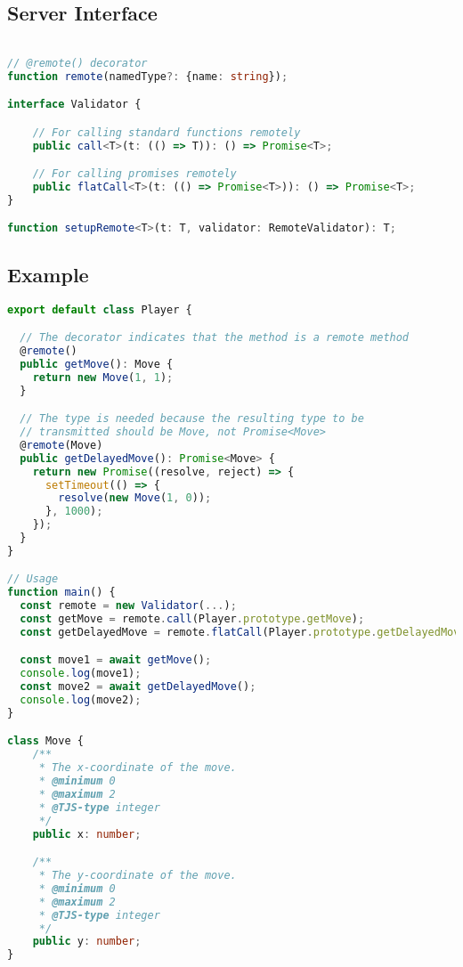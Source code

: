 \documentclass{article}
\begin{document}
\subsection*{Server Interface}

\begin{lstlisting}[language=Typescript]

// @remote() decorator
function remote(namedType?: {name: string});

interface Validator {

    // For calling standard functions remotely
    public call<T>(t: (() => T)): () => Promise<T>;

    // For calling promises remotely
    public flatCall<T>(t: (() => Promise<T>)): () => Promise<T>;
}

function setupRemote<T>(t: T, validator: RemoteValidator): T;

\end{lstlisting}

\subsection*{Example}

\begin{lstlisting}[language=Typescript]
export default class Player {

  // The decorator indicates that the method is a remote method
  @remote()
  public getMove(): Move {
    return new Move(1, 1);
  }

  // The type is needed because the resulting type to be
  // transmitted should be Move, not Promise<Move>
  @remote(Move)
  public getDelayedMove(): Promise<Move> {
    return new Promise((resolve, reject) => {
      setTimeout(() => {
        resolve(new Move(1, 0));
      }, 1000);
    });
  }
}

// Usage
function main() {
  const remote = new Validator(...);
  const getMove = remote.call(Player.prototype.getMove);
  const getDelayedMove = remote.flatCall(Player.prototype.getDelayedMove);

  const move1 = await getMove();
  console.log(move1);
  const move2 = await getDelayedMove();
  console.log(move2);
}

class Move {
    /**
     * The x-coordinate of the move.
     * @minimum 0
     * @maximum 2
     * @TJS-type integer
     */
    public x: number;

    /**
     * The y-coordinate of the move.
     * @minimum 0
     * @maximum 2
     * @TJS-type integer
     */
    public y: number;
}
\end{lstlisting}
\end{document}

